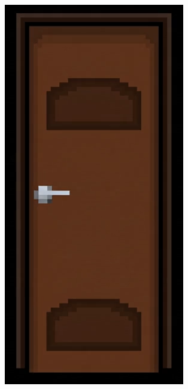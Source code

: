 \begin{figure}[htbp]
    \centering
    \caption{\small Demonstração da edição do prompt baseado no resultado do vídeo gerado no GeminiPro}
    \label{fig:geminiProPortaAMudaPrompt}
    \begin{subfigure}{0.3\linewidth}
        \centering
        \includegraphics[width=1\linewidth]{figs/geminiPro/chat7/macanetaLadoErrado.PNG}

\end{subfigure}
\end{figure}
